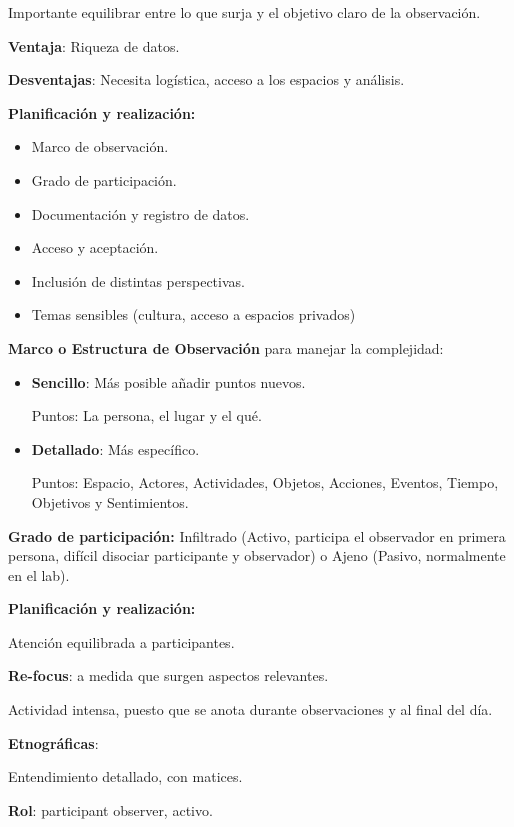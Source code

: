 \documentclass[12pt, twoside, openright]{report} %
\begin{document}
Importante equilibrar entre lo que surja y el objetivo claro de la
observación.

\textbf{Ventaja}: Riqueza de datos.

\textbf{Desventajas}: Necesita logística, acceso a los espacios y
análisis.

\textbf{Planificación y realización:}

\begin{itemize}
	\item Marco de observación.
	\item Grado de participación.
	\item Documentación y registro de datos.
	\item Acceso y aceptación.
	\item Inclusión de distintas perspectivas.
	\item Temas sensibles (cultura, acceso a espacios privados)
\end{itemize}
\pagebreak
\textbf{Marco o Estructura de Observación} para manejar la complejidad:
\begin{itemize}
	\item \textbf{Sencillo}: Más posible añadir puntos nuevos. 
	
	Puntos: La persona, el lugar y el qué.
	\item \textbf{Detallado}: Más específico.
	
	Puntos: Espacio, Actores, Actividades, Objetos, Acciones, Eventos, Tiempo, Objetivos y Sentimientos.
\end{itemize}


\textbf{Grado de participación:} Infiltrado (Activo, participa el
observador en primera persona, difícil disociar participante y
observador) o Ajeno (Pasivo, normalmente en el lab).

\textbf{Planificación y realización:}

\hspace{6mm} Atención equilibrada a participantes.

\hspace{6mm} \textbf{Re-focus}: a medida que surgen aspectos
relevantes.

\hspace{6mm} Actividad intensa, puesto que se anota durante
observaciones y al final del día.

\textbf{Etnográficas}:

\hspace{6mm} Entendimiento detallado, con matices.

\hspace{6mm} \textbf{Rol}: participant observer, activo.
\end{document}
